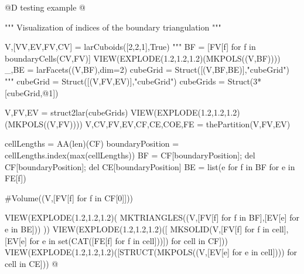 \documentclass[11pt,oneside]{article}    %
\begin{document}
@D testing example @{
""" Visualization of indices of the boundary triangulation """

V,[VV,EV,FV,CV] = larCuboids([2,2,1],True)
"""
BF = [FV[f] for f in boundaryCells(CV,FV)]
VIEW(EXPLODE(1.2,1.2,1.2)(MKPOLS((V,BF))))
_,BE = larFacets((V,BF),dim=2)
cubeGrid = Struct([(V,BF,BE)],"cubeGrid")
"""
cubeGrid = Struct([(V,FV,EV)],"cubeGrid")
cubeGrids = Struct(3*[cubeGrid,@1])

V,FV,EV = struct2lar(cubeGrids)
VIEW(EXPLODE(1.2,1.2,1.2)(MKPOLS((V,FV))))
V,CV,FV,EV,CF,CE,COE,FE = thePartition(V,FV,EV)

cellLengths = AA(len)(CF)
boundaryPosition = cellLengths.index(max(cellLengths))
BF = CF[boundaryPosition]; del CF[boundaryPosition]; del CE[boundaryPosition]
BE = list({e for f in BF for e in FE[f]})

#Volume((V,[FV[f] for f in CF[0]]))

VIEW(EXPLODE(1.2,1.2,1.2)( MKTRIANGLES((V,[FV[f] for f in BF],[EV[e] for e in BE])) ))
VIEW(EXPLODE(1.2,1.2,1.2)([ MKSOLID(V,[FV[f] for f in cell],[EV[e] for e in set(CAT([FE[f] for f in cell]))]) for cell in CF]))
VIEW(EXPLODE(1.2,1.2,1.2)([STRUCT(MKPOLS((V,[EV[e] for e in cell]))) for cell in CE]))
@}
\end{document}
